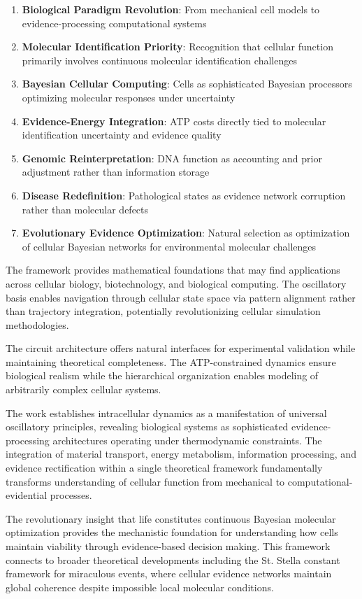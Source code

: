 \documentclass[12pt,a4paper]{article}
\begin{document}
\begin{enumerate}
\item \textbf{Biological Paradigm Revolution}: From mechanical cell models to evidence-processing computational systems
\item \textbf{Molecular Identification Priority}: Recognition that cellular function primarily involves continuous molecular identification challenges
\item \textbf{Bayesian Cellular Computing}: Cells as sophisticated Bayesian processors optimizing molecular responses under uncertainty
\item \textbf{Evidence-Energy Integration}: ATP costs directly tied to molecular identification uncertainty and evidence quality
\item \textbf{Genomic Reinterpretation}: DNA function as accounting and prior adjustment rather than information storage
\item \textbf{Disease Redefinition}: Pathological states as evidence network corruption rather than molecular defects
\item \textbf{Evolutionary Evidence Optimization}: Natural selection as optimization of cellular Bayesian networks for environmental molecular challenges
\end{enumerate}

The framework provides mathematical foundations that may find applications across cellular biology, biotechnology, and biological computing. The oscillatory basis enables navigation through cellular state space via pattern alignment rather than trajectory integration, potentially revolutionizing cellular simulation methodologies.

The circuit architecture offers natural interfaces for experimental validation while maintaining theoretical completeness. The ATP-constrained dynamics ensure biological realism while the hierarchical organization enables modeling of arbitrarily complex cellular systems.

The work establishes intracellular dynamics as a manifestation of universal oscillatory principles, revealing biological systems as sophisticated evidence-processing architectures operating under thermodynamic constraints. The integration of material transport, energy metabolism, information processing, and evidence rectification within a single theoretical framework fundamentally transforms understanding of cellular function from mechanical to computational-evidential processes.

The revolutionary insight that life constitutes continuous Bayesian molecular optimization provides the mechanistic foundation for understanding how cells maintain viability through evidence-based decision making. This framework connects to broader theoretical developments including the St. Stella constant framework for miraculous events, where cellular evidence networks maintain global coherence despite impossible local molecular conditions.
\end{document}
